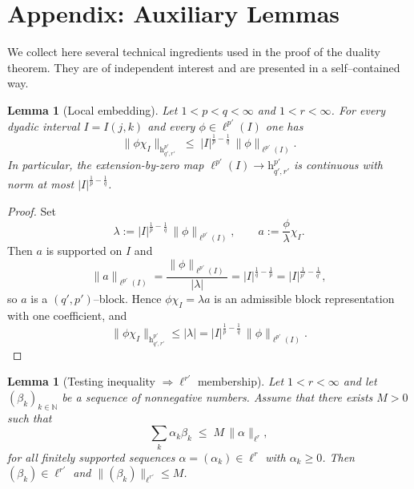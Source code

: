 \documentclass[preprint,12pt]{elsarticle}
\newtheorem{lemma}[theorem]{Lemma}
\begin{document}





\section*{Appendix: Auxiliary Lemmas}\label{app1}

We collect here several technical ingredients used in the proof of the duality theorem. 
They are of independent interest and are presented in a self–contained way.
\begin{lemma}[Local embedding]\label{lem:local_embedding}
Let $1 < p < q < \infty$ and $1 < r < \infty$.
For every dyadic interval $I=I(j,k)$ and every $\phi \in \ell^{p'}(I)$ one has
\[
  \|\phi \chi_I\|_{\mathrm{h}^{p'}_{q',r'}}
  \;\le\; |I|^{\frac{1}{p}-\frac{1}{q}}\, \|\phi\|_{\ell^{p'}(I)} .
\]
In particular, the extension-by-zero map $\ell^{p'}(I)\to \mathrm{h}^{p'}_{q',r'}$ is continuous with norm at most
$|I|^{\frac{1}{p}-\frac{1}{q}}$.
\end{lemma}

\begin{proof}
Set
\[
  \lambda := |I|^{\frac{1}{p}-\frac{1}{q}}\, \|\phi\|_{\ell^{p'}(I)},
  \qquad
  a := \frac{\phi}{\lambda}\chi_I.
\]
Then $a$ is supported on $I$ and
\[
\|a\|_{\ell^{p'}(I)}=\frac{\|\phi\|_{\ell^{p'}(I)}}{|\lambda|}
=|I|^{\frac{1}{q}-\frac{1}{p}}
=|I|^{\frac{1}{p'}-\frac{1}{q'}},
\]
so $a$ is a $(q',p')$--block. Hence $\phi\chi_I=\lambda a$ is an admissible block representation with one coefficient, and
\[
\|\phi\chi_I\|_{\mathrm{h}^{p'}_{q',r'}}\le |\lambda|
=|I|^{\frac{1}{p}-\frac{1}{q}}\, \|\phi\|_{\ell^{p'}(I)}.
\]
\end{proof}


\begin{lemma}[Testing inequality $\Rightarrow \ell^{r'}$ membership]\label{lem:testing_to_lrp}
Let $1<r<\infty$ and let $(\beta_k)_{k\in \mathbb{N}}$ be a sequence of nonnegative numbers. 
Assume that there exists $M>0$ such that
\[
  \sum_{k} \alpha_k \beta_k \;\le\; M\, \|\alpha\|_{\ell^r},
\]
for all finitely supported sequences $\alpha=(\alpha_k)\in \ell^r$ with $\alpha_k \ge 0$. 
Then $(\beta_k)\in \ell^{r'}$ and $\|(\beta_k)\|_{\ell^{r'}} \le M$.
\end{lemma}
\end{document}
